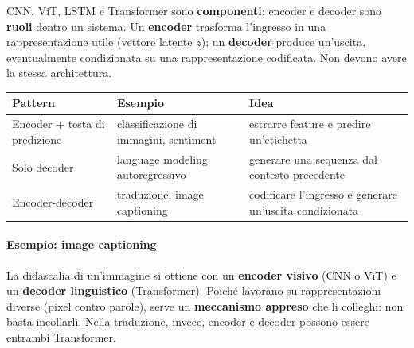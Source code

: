 \documentclass[12pt]{extarticle}
\begin{document}
\noindent CNN, ViT, LSTM e Transformer sono \textbf{componenti}; encoder e decoder sono \textbf{ruoli} dentro un sistema. Un \textbf{encoder} trasforma l'ingresso in una rappresentazione utile (vettore latente $z$); un \textbf{decoder} produce un'uscita, eventualmente condizionata su una rappresentazione codificata. Non devono avere la stessa architettura.

\begin{center}
\end{center}

\begin{center}
\small
\begin{tabular}{L{3.4cm}L{4.4cm}L{6.2cm}}
    \toprule
    \textbf{Pattern} & \textbf{Esempio} & \textbf{Idea} \\
    \midrule
    Encoder + testa di predizione & classificazione di immagini, sentiment & estrarre feature e predire un'etichetta \\
    Solo decoder & language modeling autoregressivo & generare una sequenza dal contesto precedente \\
    Encoder-decoder & traduzione, image captioning & codificare l'ingresso e generare un'uscita condizionata \\
    \bottomrule
\end{tabular}
\end{center}

\paragraph{Esempio: image captioning}
La didascalia di un'immagine si ottiene con un \textbf{encoder visivo} (CNN o ViT) e un \textbf{decoder linguistico} (Transformer). Poiché lavorano su rappresentazioni diverse (pixel contro parole), serve un \textbf{meccanismo appreso} che li colleghi: non basta incollarli. Nella traduzione, invece, encoder e decoder possono essere entrambi Transformer.
\end{document}
